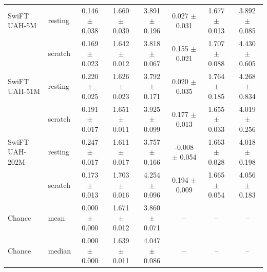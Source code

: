 \begin{table}[H]
{\begin{tabular}{llcccccc}
SwiFT UAH-5M & resting & 0.146 $\pm$ 0.038 & 1.660 $\pm$ 0.030 & 3.891 $\pm$ 0.196 & 0.027 $\pm$ 0.031 & 1.677 $\pm$ 0.013 & 3.892 $\pm$ 0.085 \\
 & scratch & 0.169 $\pm$ 0.023 & 1.642 $\pm$ 0.012 & 3.818 $\pm$ 0.067 & 0.155 $\pm$ 0.021 & 1.707 $\pm$ 0.088 & 4.430 $\pm$ 0.605 \\
SwiFT UAH-51M & resting & 0.220 $\pm$ 0.025 & 1.626 $\pm$ 0.023 & 3.792 $\pm$ 0.171 & 0.020 $\pm$ 0.035 & 1.764 $\pm$ 0.185 & 4.268 $\pm$ 0.834 \\
 & scratch & 0.191 $\pm$ 0.017 & 1.651 $\pm$ 0.011 & 3.925 $\pm$ 0.099 & 0.177 $\pm$ 0.013 & 1.655 $\pm$ 0.033 & 4.019 $\pm$ 0.256 \\
SwiFT UAH-202M & resting & 0.247 $\pm$ 0.017 & 1.611 $\pm$ 0.017 & 3.757 $\pm$ 0.166 & -0.008 $\pm$ 0.054 & 1.663 $\pm$ 0.028 & 4.018 $\pm$ 0.198 \\
 & scratch & 0.173 $\pm$ 0.013 & 1.703 $\pm$ 0.016 & 4.254 $\pm$ 0.096 & 0.194 $\pm$ 0.009 & 1.665 $\pm$ 0.054 & 4.056 $\pm$ 0.183 \\
\midrule
Chance & mean & 0.000 $\pm$ 0.000 & 1.671 $\pm$ 0.012 & 3.860 $\pm$ 0.071 & -- & -- & -- \\
Chance & median & 0.000 $\pm$ 0.000 & 1.639 $\pm$ 0.011 & 4.047 $\pm$ 0.086 & -- & -- & -- \\
\bottomrule
\end{tabular}%
}
\end{table}
